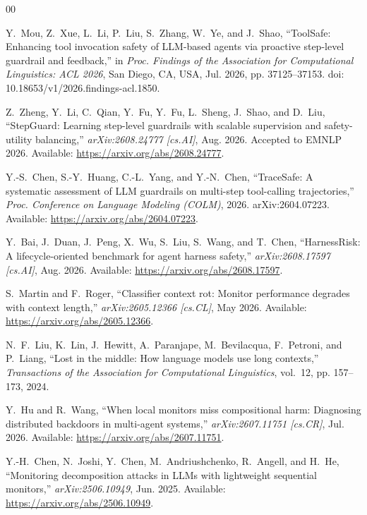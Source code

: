 \documentclass[conference]{IEEEtran}
\begin{document}
\begin{thebibliography}{00}

Y.~Mou, Z.~Xue, L.~Li, P.~Liu, S.~Zhang, W.~Ye, and J.~Shao, ``ToolSafe: Enhancing tool invocation safety of LLM-based agents via proactive step-level guardrail and feedback,'' in \emph{Proc. Findings of the Association for Computational Linguistics: ACL 2026}, San Diego, CA, USA, Jul. 2026, pp. 37125--37153. doi: 10.18653/v1/2026.findings-acl.1850.

Z.~Zheng, Y.~Li, C.~Qian, Y.~Fu, Y.~Fu, L.~Sheng, J.~Shao, and D.~Liu, ``StepGuard: Learning step-level guardrails with scalable supervision and safety-utility balancing,'' \emph{arXiv:2608.24777 [cs.AI]}, Aug. 2026. Accepted to EMNLP 2026. Available: \url{https://arxiv.org/abs/2608.24777}.

Y.-S.~Chen, S.-Y.~Huang, C.-L.~Yang, and Y.-N.~Chen, ``TraceSafe: A systematic assessment of LLM guardrails on multi-step tool-calling trajectories,'' \emph{Proc. Conference on Language Modeling (COLM)}, 2026. arXiv:2604.07223. Available: \url{https://arxiv.org/abs/2604.07223}.

Y.~Bai, J.~Duan, J.~Peng, X.~Wu, S.~Liu, S.~Wang, and T.~Chen, ``HarnessRisk: A lifecycle-oriented benchmark for agent harness safety,'' \emph{arXiv:2608.17597 [cs.AI]}, Aug. 2026. Available: \url{https://arxiv.org/abs/2608.17597}.

S.~Martin and F.~Roger, ``Classifier context rot: Monitor performance degrades with context length,'' \emph{arXiv:2605.12366 [cs.CL]}, May 2026. Available: \url{https://arxiv.org/abs/2605.12366}.

N.~F.~Liu, K.~Lin, J.~Hewitt, A.~Paranjape, M.~Bevilacqua, F.~Petroni, and P.~Liang, ``Lost in the middle: How language models use long contexts,'' \emph{Transactions of the Association for Computational Linguistics}, vol.~12, pp. 157--173, 2024.

Y.~Hu and R.~Wang, ``When local monitors miss compositional harm: Diagnosing distributed backdoors in multi-agent systems,'' \emph{arXiv:2607.11751 [cs.CR]}, Jul. 2026. Available: \url{https://arxiv.org/abs/2607.11751}.

Y.-H.~Chen, N.~Joshi, Y.~Chen, M.~Andriushchenko, R.~Angell, and H.~He, ``Monitoring decomposition attacks in LLMs with lightweight sequential monitors,'' \emph{arXiv:2506.10949}, Jun. 2025. Available: \url{https://arxiv.org/abs/2506.10949}.


\end{thebibliography}
\end{document}
